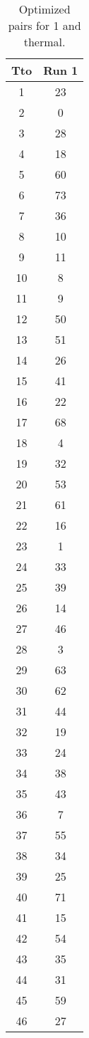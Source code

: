 \begin{table}
  \centering
  \scriptsize
  \caption{Optimized pairs for 1 and thermal.}
  \label{tab_pairs}
\begin{tabular}{c c }
\hline
Tto & Run 1 \\
\hline
1 & 23 \\
2 & 0 \\
3 & 28 \\
4 & 18 \\
5 & 60 \\
6 & 73 \\
7 & 36 \\
8 & 10 \\
9 & 11 \\
10 & 8 \\
11 & 9 \\
12 & 50 \\
13 & 51 \\
14 & 26 \\
15 & 41 \\
16 & 22 \\
17 & 68 \\
18 & 4 \\
19 & 32 \\
20 & 53 \\
21 & 61 \\
22 & 16 \\
23 & 1 \\
24 & 33 \\
25 & 39 \\
26 & 14 \\
27 & 46 \\
28 & 3 \\
29 & 63 \\
30 & 62 \\
31 & 44 \\
32 & 19 \\
33 & 24 \\
34 & 38 \\
35 & 43 \\
36 & 7 \\
37 & 55 \\
38 & 34 \\
39 & 25 \\
40 & 71 \\
41 & 15 \\
42 & 54 \\
43 & 35 \\
44 & 31 \\
45 & 59 \\
46 & 27 \\

\end{tabular}
\end{table}
